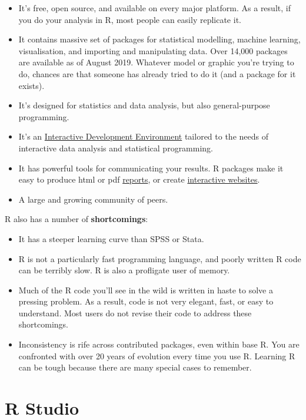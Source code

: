 \documentclass[]{book}
\begin{document}
\begin{itemize}
\item
  It's free, open source, and available on every major platform. As a
  result, if you do your analysis in R, most people can easily replicate
  it.
\item
  It contains massive set of packages for statistical modelling, machine
  learning, visualisation, and importing and manipulating data. Over
  14,000 packages are available as of August 2019. Whatever model or
  graphic you're trying to do, chances are that someone has already
  tried to do it (and a package for it exists).
\item
  It's designed for statistics and data analysis, but also
  general-purpose programming.
\item
  It's an \href{http://www.rstudio.com/ide/}{Interactive Development
  Environment} tailored to the needs of interactive data analysis and
  statistical programming.
\item
  It has powerful tools for communicating your results. R packages make
  it easy to produce html or pdf
  \href{http://yihui.name/knitr/}{reports}, or create
  \href{http://www.rstudio.com/shiny/}{interactive websites}.
\item
  A large and growing community of peers.
\end{itemize}

R also has a number of \textbf{shortcomings}:

\begin{itemize}
\item
  It has a steeper learning curve than SPSS or Stata.
\item
  R is not a particularly fast programming language, and poorly written
  R code can be terribly slow. R is also a profligate user of memory.
\item
  Much of the R code you'll see in the wild is written in haste to solve
  a pressing problem. As a result, code is not very elegant, fast, or
  easy to understand. Most users do not revise their code to address
  these shortcomings.
\item
  Inconsistency is rife across contributed packages, even within base R.
  You are confronted with over 20 years of evolution every time you use
  R. Learning R can be tough because there are many special cases to
  remember.
\end{itemize}

\hypertarget{r-studio-1}{\section{R Studio}\label{r-studio-1}}
\end{document}
